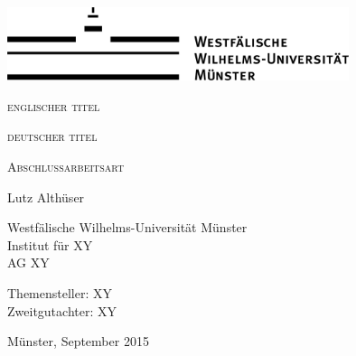 \begin{titlepage}
\thispagestyle{empty}
 \begin{center}
 \includegraphics[width=10cm]{res/WWU_Logo1_1c}
 \par
 \vspace*{10ex}
 \huge
 \textsc{englischer titel}
 \par
 \vspace*{3ex}
 \textsc{deutscher titel}
 \par
 \normalsize
 \vspace*{25ex}
 \large
 \textsc{Abschlussarbeitsart}\\
 \par
 \large
 Lutz Althüser
 \par
 \normalsize
 \vspace*{1ex}
Westfälische Wilhelms-Universität Münster\\
Institut für XY \\
AG XY
\par
\vspace*{15ex}
Themensteller: XY \\ 
Zweitgutachter: XY
\par
\normalsize
\vspace*{2ex}
Münster, September 2015
\end{center}
\clearpage

\end{titlepage}
